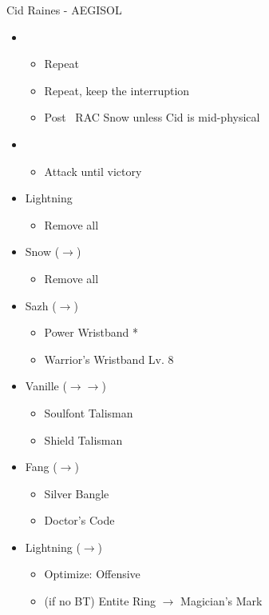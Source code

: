 \begin{battle}[1:25]{Cid Raines - AEGISOL}
\begin{itemize}
\begin{itemize}
			      \end{itemize}
			\item \second
			      \begin{itemize}
				      \item Repeat
				      \item Repeat, keep the interruption
				      \item Post \stagger~RAC Snow unless Cid is mid-physical
			      \end{itemize}
			\item \fourth
			      \begin{itemize}
				      \item Attack until victory
			      \end{itemize}
		\end{itemize}
		\end{battle}

	\begin{menu}
		\begin{itemize}
			\equip
			\begin{itemize}
				\item Lightning
				      \begin{itemize}
					      \item Remove all
				      \end{itemize}
				\item Snow ($\rightarrow$)
				      \begin{itemize}
					      \item Remove all
				      \end{itemize}
				\item Sazh ($\rightarrow$)
				      \begin{itemize}
					      \item Power Wristband *
					      \item Warrior's Wristband Lv. 8
				      \end{itemize}
				\item Vanille ($\rightarrow\rightarrow$)
				      \begin{itemize}
					      \item Soulfont Talisman
					      \item Shield Talisman
				      \end{itemize}
				\item Fang ($\rightarrow$)
				      \begin{itemize}
					      \item Silver Bangle
					      \item Doctor's Code
				      \end{itemize}
				\item Lightning ($\rightarrow$)
				      \begin{itemize}
					      \item Optimize: Offensive
					      \item (if no BT) Entite Ring $\rightarrow$ Magician's Mark
				      \end{itemize}
			\end{itemize}
		\end{itemize}
	\end{menu}

